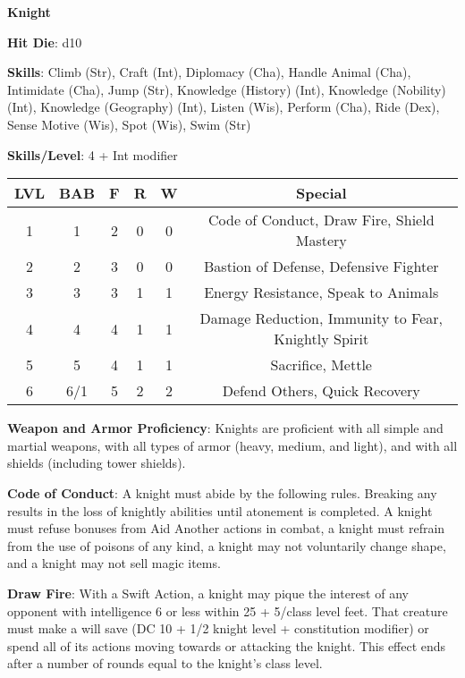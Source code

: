 \textbf{\huge{Knight}}

\textbf{Hit Die}: d10

\textbf{Skills}: Climb (Str), Craft (Int), Diplomacy (Cha), Handle Animal (Cha), Intimidate (Cha), Jump (Str), Knowledge (History) (Int), Knowledge (Nobility) (Int), Knowledge (Geography) (Int), Listen (Wis), Perform (Cha), Ride (Dex), Sense Motive (Wis), Spot (Wis), Swim (Str)

\textbf{Skills/Level}: 4 + Int modifier

\begin{center}
\begin{adjustwidth}{-4cm}{}
\begin{small}
\begin{tabular}{| c | c | c | c | c | c |}
\hline
LVL &BAB &F &R &W &Special \\
\hline
1 &1 &2 &0 &0 &Code of Conduct, Draw Fire, Shield Mastery \\
2 &2 &3 &0 &0 &Bastion of Defense, Defensive Fighter \\
3 &3 &3 &1 &1 &Energy Resistance, Speak to Animals \\
4 &4 &4 &1 &1 &Damage Reduction, Immunity to Fear, Knightly Spirit \\
5 &5 &4 &1 &1 &Sacrifice, Mettle \\
6 &6/1 &5 &2 &2 &Defend Others, Quick Recovery \\
\hline
\end{tabular}
\end{small}
\end{adjustwidth}
\end{center}

\textbf{Weapon and Armor Proficiency}: Knights are proficient with all simple and martial weapons, with all types of armor (heavy, medium, and light), and with all shields (including tower shields).

\textbf{Code of Conduct}: A knight must abide by the following rules. Breaking any results in the loss of knightly abilities until atonement is completed. A knight must refuse bonuses from Aid Another actions in combat, a knight must refrain from the use of poisons of any kind, a knight may not voluntarily change shape, and a knight may not sell magic items.

\textbf{Draw Fire}: With a Swift Action, a knight may pique the interest of any opponent with intelligence 6 or less within 25 + 5/class level feet. That creature must make a will save (DC 10 + 1/2 knight level + constitution modifier) or spend all of its actions moving towards or attacking the knight. This effect ends after a number of rounds equal to the knight’s class level.

